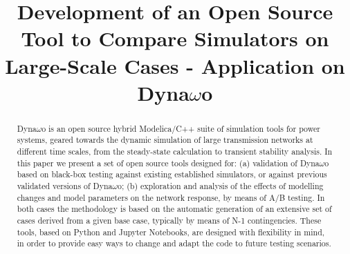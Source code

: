 \documentclass[conference]{IEEEtran}
\begin{document}
\title{Development of an Open Source Tool to Compare Simulators on Large-Scale Cases - Application on Dyna$\omega$o}%


\author{
}

\maketitle

\begin{abstract}
  Dyna$\omega$o is an open source hybrid Modelica/C++ suite of simulation tools for power systems, geared
  towards the dynamic simulation of large transmission networks at different
  time scales, from the steady-state calculation to transient stability analysis. In this paper we present a set of open source tools designed for: (a)
  validation of Dyna$\omega$o based on black-box testing against existing established
  simulators, or against previous validated versions of Dyna$\omega$o; (b) exploration
  and analysis of the effects of modelling changes and model parameters on the
  network response, by means of A/B testing. In both cases the methodology is
  based on the automatic generation of an extensive set of cases derived from a
  given base case, typically by means of N-1 contingencies. These tools, based
  on Python and Jupyter Notebooks, are designed with flexibility in mind, in
  order to provide easy ways to change and adapt the code to future testing
  scenarios.
\end{abstract}
\end{document}
